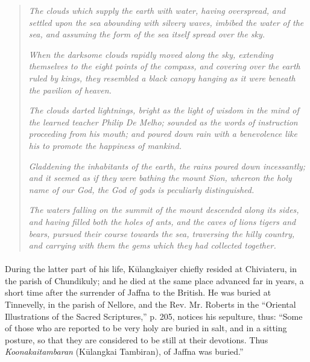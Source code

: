 \documentclass{article}
\begin{document}
\begin{quotation}\small
\emph{The clouds which supply the earth with water, having overspread, and settled upon the sea abounding with silvery waves, imbibed the water of the sea, and assuming the form of the sea itself spread over the sky.}

\emph{When the darksome clouds rapidly moved along the sky, extending themselves to the eight points of the compass, and covering over the earth ruled by kings, they resembled a black canopy hanging as it were beneath the pavilion of heaven.}

\emph{The clouds darted lightnings, bright as the light of wisdom in the mind of the learned teacher Philip De Melho; sounded as the words of instruction proceeding from his mouth; and poured down rain with a benevolence like his to promote the happiness of mankind.}

\emph{Gladdening the inhabitants of the earth, the rains poured down incessantly; and it seemed as if they were bathing the mount Sion, whereon the holy name of our God, the God of gods is peculiarly distinguished.}

\emph{The waters falling on the summit of the mount descended along its sides, and having filled both the holes of ants, and the caves of lions tigers and bears, pursued their course towards the sea, traversing the hilly country, and carrying with them the gems which they had collected together.}
\end{quotation}
\paragraph{}
During the latter part of his life, K\={u}langkaiyer chiefly resided at Chiviateru, in the parish of Chundikuly; and he died at the same place advanced far in years, a short time after the surrender of Jaffna to the British. He was buried at Tinnevelly, in the parish of Nellore, and the Rev. Mr. Roberts in the ``Oriental Illustrations of the Sacred Scriptures,'' p. 205, notices his sepulture, thus: ``Some of those who are reported to be very holy are buried in salt, and in a sitting posture, so that they are considered to be still at their devotions. Thus \emph{Koonakaitambaran} (K\={u}langkai Tambiran), of Jaffna was buried.''
\end{document}
